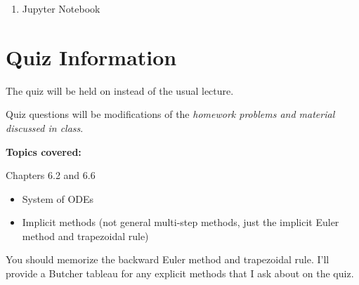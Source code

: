 \documentclass[reqno, answers]{exam}
\begin{document}
\begin{enumerate}
\begin{parts}
\begin{solution}

\end{solution}
  \end{parts}

  \item Jupyter Notebook

\end{enumerate}

\newpage
\section*{Quiz Information}

The quiz will be held on  instead of the usual lecture.

Quiz questions will be modifications of the {\it homework problems and material discussed in class}.

\textbf{Topics covered:}

Chapters 6.2 and 6.6

\begin{itemize}
  \item System of ODEs
  \item Implicit methods (not general multi-step methods, just the implicit Euler method and trapezoidal rule)
\end{itemize}

You should memorize the backward Euler method and trapezoidal rule. I'll provide a Butcher tableau for any explicit methods that I ask about on the quiz.
\end{document}

